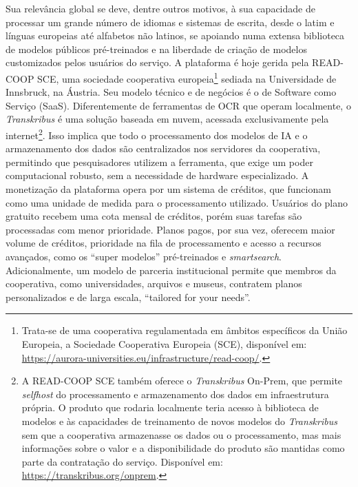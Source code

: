\documentclass[portuguese]{textolivre}
\begin{document}
Sua relevância global se deve, dentre outros motivos, à sua capacidade de processar um grande número de idiomas e sistemas de escrita, desde o latim e línguas europeias até alfabetos não latinos, se apoiando numa extensa biblioteca de modelos públicos pré-treinados e na liberdade de criação de modelos customizados pelos usuários do serviço. A plataforma é hoje gerida pela READ-COOP SCE, uma sociedade cooperativa europeia\footnote{Trata-se de uma cooperativa regulamentada em âmbitos específicos da União Europeia, a Sociedade Cooperativa Europeia (SCE), disponível em: \url{https://aurora-universities.eu/infrastructure/read-coop/}.} sediada na Universidade de Innsbruck, na Áustria. Seu modelo técnico e de negócios é o de Software como Serviço (SaaS). Diferentemente de ferramentas de OCR que operam localmente, o \textit{Transkribus} é uma solução baseada em nuvem, acessada exclusivamente pela internet\footnote{A READ-COOP SCE também oferece o \textit{Transkribus} On-Prem, que permite \textit{selfhost} do processamento e armazenamento dos dados em infraestrutura própria. O produto que rodaria localmente teria acesso à biblioteca de modelos e às capacidades de treinamento de novos modelos do \textit{Transkribus} sem que a cooperativa armazenasse os dados ou o processamento, mas mais informações sobre o valor e a disponibilidade do produto são mantidas como parte da contratação do serviço. Disponível em: \url{https://transkribus.org/onprem}.}. Isso implica que todo o processamento dos modelos de IA e o armazenamento dos dados são centralizados nos servidores da cooperativa, permitindo que pesquisadores utilizem a ferramenta, que exige um poder computacional robusto, sem a necessidade de hardware especializado. A monetização da plataforma opera por um sistema de créditos, que funcionam como uma unidade de medida para o processamento utilizado. Usuários do plano gratuito recebem uma cota mensal de créditos, porém suas tarefas são processadas com menor prioridade. Planos pagos, por sua vez, oferecem maior volume de créditos, prioridade na fila de processamento e acesso a recursos avançados, como os “super modelos” pré-treinados e \textit{smartsearch}. Adicionalmente, um modelo de parceria institucional permite que membros da cooperativa, como universidades, arquivos e museus, contratem planos personalizados e de larga escala, “tailored for your needs”.
\end{document}
